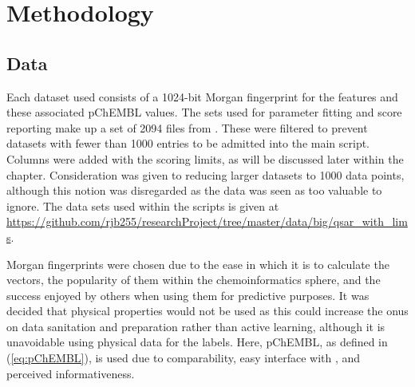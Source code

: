 \chapter{Methodology}
\label{ch:method}

\graphicspath{{Chapter3/Figs/Vector/}{Chapter3/Figs/}}

\section{Data}
Each dataset used consists of a 1024-bit Morgan fingerprint for the features and these associated pChEMBL values. The sets used for parameter fitting and score reporting make up a set of 2094 files from \textcite{CHEMBL}. These were filtered to prevent datasets with fewer than 1000 entries to be admitted into the main script. Columns were added with the scoring limits, as will be discussed later within the chapter. Consideration was given to reducing larger datasets to 1000 data points, although this notion was disregarded as the data was seen as too valuable to ignore. The data sets used within the scripts is given at \url{https://github.com/rjb255/researchProject/tree/master/data/big/qsar_with_lims}.

Morgan fingerprints were chosen due to the ease in which it is to calculate the vectors, the popularity of them within the chemoinformatics sphere, and the success enjoyed by others when using them for predictive purposes. It was decided that physical properties would not be used as this could increase the onus on data sanitation and preparation rather than active learning, although it is unavoidable using physical data for the labels. Here, pChEMBL, as defined in (\ref{eq:pChEMBL}), is used due to comparability, easy interface with \textcite{CHEMBL}, and perceived informativeness.

